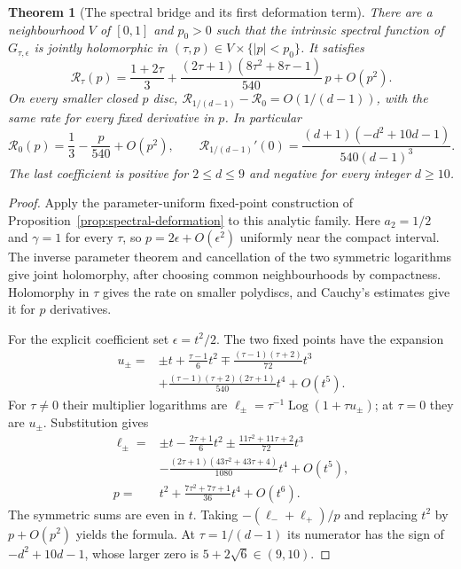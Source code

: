 \documentclass[11pt]{article}
\newtheorem{theorem}{Theorem}
\newcommand{\Log}{\operatorname{Log}}
\begin{document}
\begin{theorem}[The spectral bridge and its first deformation term]
\label{thm:degree-spectral}
There are a neighbourhood $V$ of $[0,1]$ and $p_0>0$ such that the
intrinsic spectral function of $G_{\tau,\epsilon}$ is jointly
holomorphic in $(\tau,p)\in V\times\{|p|<p_0\}$. It satisfies
\[
 \mathcal R_\tau(p)=\frac{1+2\tau}{3}
 +\frac{(2\tau+1)(8\tau^2+8\tau-1)}{540}\,p+O(p^2).
\]
On every smaller closed $p$ disc,
$\mathcal R_{1/(d-1)}-\mathcal R_0=O(1/(d-1))$, with the same
rate for every fixed derivative in $p$. In particular
\[
 \mathcal R_0(p)=\frac13-\frac{p}{540}+O(p^2),\qquad
 \mathcal R_{1/(d-1)}'(0)
 =\frac{(d+1)(-d^2+10d-1)}{540(d-1)^3}.
\]
The last coefficient is positive for $2\le d\le9$ and negative
for every integer $d\ge10$.
\end{theorem}
\begin{proof}
Apply the parameter-uniform fixed-point construction of
Proposition~\ref{prop:spectral-deformation} to this analytic family.
Here $a_2=1/2$ and $\gamma=1$ for every $\tau$, so
$p=2\epsilon+O(\epsilon^2)$ uniformly near the compact interval.
The inverse parameter theorem and cancellation of the two symmetric
logarithms give joint holomorphy, after choosing common neighbourhoods
by compactness. Holomorphy in $\tau$ gives the rate on smaller
polydiscs, and Cauchy's estimates give it for $p$ derivatives.

For the explicit coefficient set $\epsilon=t^2/2$. The two fixed
points have the expansion
\[
\begin{aligned}
 u_\pm={}&\pm t+\frac{\tau-1}{6}t^2
 \mp\frac{(\tau-1)(\tau+2)}{72}t^3\\
 &+\frac{(\tau-1)(\tau+2)(2\tau+1)}{540}t^4+O(t^5).
\end{aligned}
\]
For $\tau\ne0$ their multiplier logarithms are
$\ell_\pm=\tau^{-1}\Log(1+\tau u_\pm)$; at $\tau=0$ they are
$u_\pm$. Substitution gives
\[
\begin{aligned}
 \ell_\pm={}&\pm t-\frac{2\tau+1}{6}t^2
 \pm\frac{11\tau^2+11\tau+2}{72}t^3\\
 &-\frac{(2\tau+1)(43\tau^2+43\tau+4)}{1080}t^4+O(t^5),\\
 p={}&t^2+\frac{7\tau^2+7\tau+1}{36}t^4+O(t^6).
\end{aligned}
\]
The symmetric sums are even in $t$. Taking
$-(\ell_-+\ell_+)/p$ and replacing $t^2$ by $p+O(p^2)$ yields
the formula. At $\tau=1/(d-1)$ its numerator has the sign of
$-d^2+10d-1$, whose larger zero is $5+2\sqrt6\in(9,10)$.
\end{proof}
\end{document}
